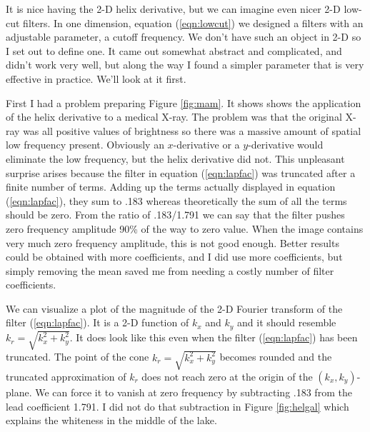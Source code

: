 
\par
It is nice having the 2-D helix derivative,
but we can imagine even nicer 2-D low-cut filters.
In one dimension,
equation 
(\ref{eqn:lowcut})
we designed a filters with an adjustable parameter,
a cutoff frequency.
We don't have such an object in 2-D so
I set out to define one.
It came out somewhat
abstract and complicated,
and didn't work very well, 
but along the way
I found a simpler parameter that is very effective in practice.
We'll look at it first.


\par
First I had a problem preparing Figure \ref{fig:mam}.
It shows shows the application of the helix derivative
to a medical X-ray.
The problem was that the original X-ray was all positive
values of brightness so there was a massive amount of
spatial low frequency present.
Obviously an $x$-derivative or a $y$-derivative would
eliminate the low frequency, but the helix derivative did not.
This unpleasant surprise arises
because the filter in equation
(\ref{eqn:lapfac})
was truncated after a finite number of terms.
Adding up the terms actually displayed in equation
(\ref{eqn:lapfac}),
they sum to .183 whereas theoretically the sum of all the terms should be zero.
From the ratio of .183/1.791 we can say that the filter
pushes zero frequency amplitude 90\% of the way to zero value.
When the image contains very much zero frequency amplitude,
this is not good enough.
Better results could be obtained with more coefficients,
and I did use more coefficients,
but simply removing the mean saved me
from needing a costly number of filter coefficients.


\par
We can visualize a plot of the magnitude of the 2-D
Fourier transform of the filter
(\ref{eqn:lapfac}).
It is a 2-D function of $k_x$ and $k_y$ and it should
resemble $k_r=\sqrt{k_x^2+k_y^2}$.
It does look like this even when the filter
(\ref{eqn:lapfac})
has been truncated.
The point of the cone $k_r=\sqrt{k_x^2+k_y^2}$ becomes
rounded and the truncated approximation of
$k_r$ does not reach zero at the origin of the $(k_x,k_y)$-plane.
We can force it to vanish at zero frequency
by subtracting .183 from the lead coefficient 1.791.
I did not do that subtraction in Figure
\ref{fig:helgal}
which explains the whiteness in the middle of the lake.

